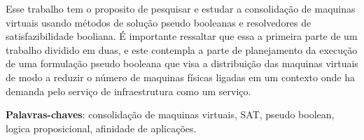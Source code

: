 \begin{resumo}

Esse trabalho tem o proposito de pesquisar e estudar a consolidação de maquinas virtuais usando métodos de solução pseudo booleanas e resolvedores de satisfazibilidade booliana. É importante ressaltar que essa a primeira parte de um trabalho dividido em duas, e este contempla a parte de planejamento da execução de uma formulação pseudo booleana que visa a distribuição das maquinas virtuais de modo a reduzir o número de maquinas físicas ligadas em um contexto onde ha demanda pelo serviço de infraestrutura como um serviço.

 \vspace{\onelineskip}
    
 \noindent
 \textbf{Palavras-chaves}: consolidação de maquinas virtuais, SAT, pseudo boolean, logica proposicional, afinidade de aplicações. 
\end{resumo}
